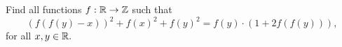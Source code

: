 Find all functions $f :\Bbb{ R}\to \Bbb{Z}$ such that $$\left( f(f(y) - x) \right)^2+ f(x)^2 + f(y)^2 = f(y) \cdot \left( 1 + 2f(f(y)) \right),$$for all $x, y \in \Bbb{R}.$